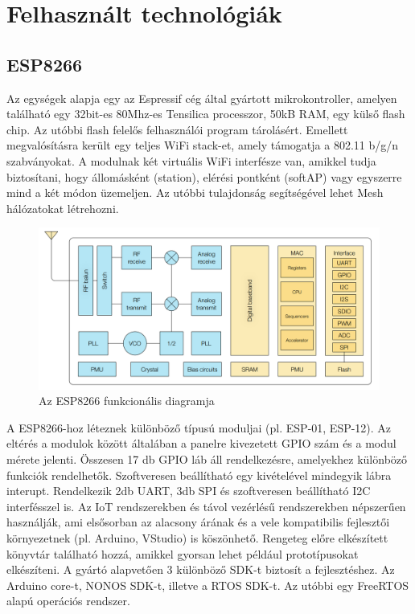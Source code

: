 



\chapter{Felhasznált technológiák}
\section{ESP8266}
Az egységek alapja egy az Espressif cég által gyártott mikrokontroller, amelyen található egy 32bit-es 80Mhz-es Tensilica processzor, 50kB RAM, egy külső flash chip. Az utóbbi flash felelős felhasználói program tárolásért. Emellett megvalósításra került egy teljes WiFi stack-et, amely támogatja a 802.11 b/g/n szabványokat. A modulnak két virtuális WiFi interfésze van, amikkel tudja biztosítani, hogy állomásként (station), elérési pontként (softAP) vagy egyszerre mind a két módon üzemeljen. Az utóbbi tulajdonság segítségével lehet Mesh hálózatokat létrehozni.

\begin{figure}[!ht]
    \centering
    \includegraphics[width=150mm, keepaspectratio]{figures/esp8266funcdiag.png}
    \caption{Az ESP8266 funkcionális diagramja}
    \label{fig:TeXstudio}
\end{figure}

A ESP8266-hoz léteznek különböző típusú moduljai (pl. ESP-01, ESP-12). Az eltérés a modulok között általában a panelre kivezetett GPIO szám és a modul mérete jelenti. Összesen 17 db GPIO láb áll rendelkezésre, amelyekhez különböző funkciók rendelhetők. Szoftveresen beállítható egy kivételével mindegyik lábra interupt. Rendelkezik 2db UART, 3db SPI és szoftveresen beállítható I2C interfésszel is.
Az IoT rendszerekben és távol vezérlésű rendszerekben népszerűen használják, ami elsősorban az alacsony árának és a vele kompatibilis fejlesztői környezetnek (pl. Arduino, VStudio) is köszönhető. Rengeteg előre elkészített könyvtár található hozzá, amikkel gyorsan lehet például prototípusokat elkészíteni. A gyártó alapvetően 3 különböző SDK-t biztosít a fejlesztéshez. Az Arduino core-t, NONOS SDK-t, illetve a RTOS SDK-t. Az utóbbi egy FreeRTOS alapú operációs rendszer.

